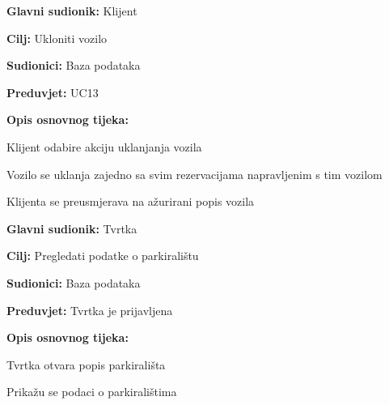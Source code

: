 \noindent {}
\begin{packed_item}
	
	\item \textbf{Glavni sudionik:} Klijent
	\item \textbf{Cilj:} Ukloniti vozilo
	\item \textbf{Sudionici:} Baza podataka
	\item \textbf{Preduvjet:} UC13
	\item \textbf{Opis osnovnog tijeka:}
	
	\item[] \begin{packed_enum}
		
		\item Klijent odabire akciju uklanjanja vozila
		\item Vozilo se uklanja zajedno sa svim rezervacijama napravljenim s tim vozilom
		\item Klijenta se preusmjerava na ažurirani popis vozila

	\end{packed_enum}
\end{packed_item}

\pagebreak

\noindent {}
\begin{packed_item}
	
	\item \textbf{Glavni sudionik: } Tvrtka
	\item \textbf{Cilj:} Pregledati podatke o parkiralištu
	\item \textbf{Sudionici:} Baza podataka
	\item \textbf{Preduvjet:} Tvrtka je prijavljena
	\item \textbf{Opis osnovnog tijeka:}
	
	\item[] \begin{packed_enum}
		
		\item Tvrtka otvara popis parkirališta 
		\item Prikažu se podaci o parkiralištima
	
	\end{packed_enum}
\end{packed_item}

